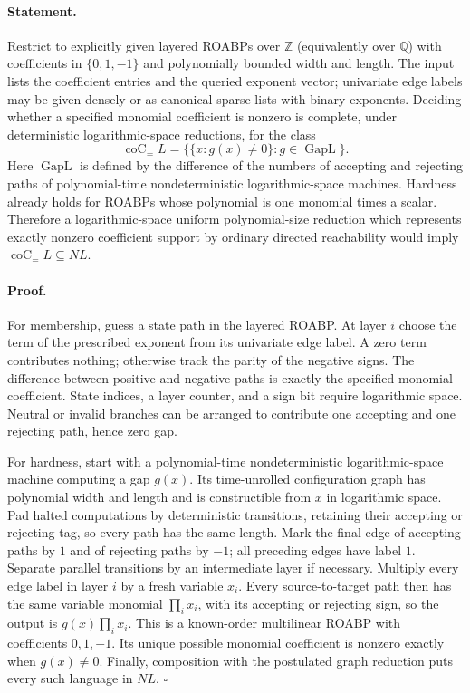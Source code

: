 \documentclass[11pt,a4paper]{article}
\theoremstyle{definition}\newtheorem{definition}{Definition}
\begin{document}
\paragraph{Statement.}
Restrict to explicitly given layered ROABPs over $\mathbb Z$
(equivalently over $\mathbb Q$) with coefficients in
$\{0,1,-1\}$ and polynomially bounded width and length.  The input
lists the coefficient entries and the queried exponent vector;
univariate edge labels may be given densely or as canonical sparse
lists with binary exponents.  Deciding
whether a specified monomial coefficient is nonzero is complete,
under deterministic logarithmic-space reductions, for the class
\[
 \operatorname{coC}_{=}L
   =\{\{x:g(x)\ne0\}:g\in\operatorname{GapL}\}.
\]
Here $\operatorname{GapL}$ is defined by the difference of the
numbers of accepting and rejecting paths of polynomial-time
nondeterministic logarithmic-space machines.  Hardness already
holds for ROABPs whose polynomial is one monomial times a scalar.
Therefore a logarithmic-space uniform polynomial-size reduction
which represents exactly nonzero coefficient support by ordinary
directed reachability would imply
$\operatorname{coC}_{=}L\subseteq NL$.

\paragraph{Proof.}
For membership, guess a state path in the layered ROABP.  At layer
$i$ choose the term of the prescribed exponent from its univariate
edge label.  A zero term contributes nothing; otherwise track the
parity of the negative signs.  The difference between positive and
negative paths is exactly the specified monomial coefficient.
State indices, a layer counter, and a sign bit require logarithmic
space.  Neutral or invalid branches can be arranged to contribute
one accepting and one rejecting path, hence zero gap.

For hardness, start with a polynomial-time nondeterministic
logarithmic-space machine computing a gap $g(x)$.  Its time-unrolled
configuration graph has polynomial width and length and is
constructible from $x$ in logarithmic space.  Pad halted computations
by deterministic transitions, retaining their accepting or rejecting
tag, so every path has the same length.  Mark the final edge
of accepting paths by $1$ and of rejecting paths by $-1$;
all preceding edges have label $1$.  Separate parallel transitions
by an intermediate layer if necessary.  Multiply every edge label
in layer $i$ by a fresh variable $x_i$.  Every source-to-target path
then has the same variable monomial $\prod_i x_i$, with its
accepting or rejecting sign, so the output is
$g(x)\prod_i x_i$.  This is a known-order multilinear ROABP with
coefficients $0,1,-1$.  Its unique possible monomial coefficient
is nonzero exactly when $g(x)\ne0$.  Finally, composition with the
postulated graph reduction puts every such language in $NL$.
\hfill$\square$
\end{document}
